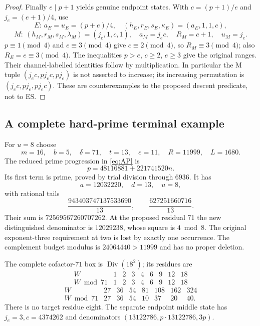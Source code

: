 \begin{proof}
Finally $e\mid p+1$ yields genuine endpoint states. With
$c=(p+1)/e$ and $j_e=(e+1)/4$, use
\[
 E:\ a_E=u_E=(p+e)/4,\quad(h_E,r_E,s_E,\kappa_E)=(a_E,1,1,c),
\]
\[
 M:\ (h_M,r_M,s_M,\lambda_M)=(j_e,1,c,1),\quad
 a_M=j_ec,\quad R_M=c+1,\quad u_M=j_e.
\]
$p\equiv1\pmod4$ and $e\equiv3\pmod4$ give $c\equiv2\pmod4$, so
$R_M\equiv3\pmod4$; also $R_E=e\equiv3\pmod4$.
The inequalities $p>e$, $c\ge2$, $e\ge3$ give the original ranges. Their
channel-labelled identities follow by multiplication.  In particular the M
tuple $(j_ec,pj_ec,pj_e)$ is not asserted to increase; its increasing
permutation is $(j_ec,pj_e,pj_ec)$.  These are counterexamples to
the proposed descent predicate, not to ES.
\end{proof}

\subsection{A complete hard-prime terminal example}
For $u=8$ choose
\[
 m=16,\quad b=5,\quad\delta=71,\quad t=13,\quad e=11,
 \quad R=11999,\quad L=1680.
\]
The reduced prime progression in \eqref{eq:AP} is
\[
 \boxed{p=48116881+221741520n.}
\]
Its first term is prime, proved by trial division through $6936$. It has
\[
 a=12032220,\quad d=13,\quad u=8,
\]
with rational tails
\[
 \frac{943403747137533690}{13},\qquad
 \frac{627251660716}{13}.
\]
Their sum is $72569567260707262$. At the proposed residual 71 the new
distinguished denominator is $12029238$, whose square is $4\bmod8$.
The original exponent-three requirement at two is lost by exactly one occurrence.
The complement budget modulus is $24064440>11999$ and has no proper deletion.

The complete cofactor-$71$ box is $\operatorname{Div}(18^2)$; its residues are
\[
\begin{array}{c|rrrrrrrr}
 W&1&2&3&4&6&9&12&18\\\hline
 W\bmod71&1&2&3&4&6&9&12&18
\end{array}
\]
\[
\begin{array}{c|rrrrrrr}
 W&27&36&54&81&108&162&324\\\hline
 W\bmod71&27&36&54&10&37&20&40.
\end{array}
\]
There is no target residue eight. The separate endpoint middle state has
$j_e=3,c=4374262$ and denominators $(13122786,p\cdot13122786,3p)$.

